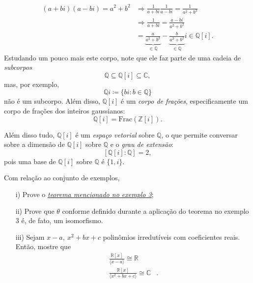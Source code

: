 \documentclass[../algebraIII_notes.tex]{subfiles}
\begin{document}
\begin{example}
\begin{itemize}
		      \begin{align*}
			      (a+bi)(a-bi) = a^{2} + b^{2} & \Rightarrow \frac{1}{a+bi}\frac{1}{a-bi} = \frac{1}{a^{2}+b^{2}}                                                               \\
			                                   & \Rightarrow \frac{1}{a+bi} = \frac{a-bi}{a^{2}+b^{2}}                                                                          \\
			                                   & = \underbrace{\frac{a}{a^{2}+b^{2}}}_{\in \mathbb{Q}} - \underbrace{\frac{b}{a^{2}+b^{2}}}_{\in \mathbb{Q}}i\in \mathbb{Q}[i].
		      \end{align*}
		      Estudando um pouco mais este corpo, note que ele faz parte de uma cadeia de \textit{subcorpos}
		      \[
			      \mathbb{Q}\subseteq \mathbb{Q}[i]\subseteq \mathbb{C},
		      \]
		      mas, por exemplo,
		      \[
			      \mathbb{Q}i\coloneqq \{bi: b \in \mathbb{Q}\}
		      \]
		      não é um subcorpo. Além disso, \(\mathbb{Q}[i]\) é um \textit{corpo de frações}, especificamente um corpo de frações dos inteiros gaussianos:
		      \[
			      \mathbb{Q}[i] = \mathrm{Frac}(\mathbb{Z}[i]).
		      \]

		      Além disso tudo, \(\mathbb{Q}[i]\) é um \textit{espaço vetorial} sobre \(\mathbb{Q}\), o que permite conversar sobre a dimensão de \(\mathbb{Q}[i]\) sobre \(\mathbb{Q}\) e o \textit{grau de extensão}:
		      \[
			      [\mathbb{Q}[i]:\mathbb{Q}] = 2,
		      \]
		      pois uma base de \(\mathbb{Q}[i]\) sobre \(\mathbb{Q}\) é \(\{1, i\}\).
	\end{itemize}
\end{example}

\begin{exr}
	Com relação ao conjunto de exemplos,
	\begin{itemize}
		\item[i)] Prove o \hyperlink{field_generator}{\textit{teorema mencionado no exemplo 3}};
		\item[ii)] Prove que \(\theta \) conforme definido durante a aplicação do teorema no exemplo 3 é, de fato, um isomorfismo.
		\item[iii)] Sejam \(x-a,\: x^{2}+bx+c\) polinômios irredutíveis com coeficientes reais. Então, mostre que
		      \begin{align*}
			      \frac{\mathbb{R}[x]}{\langle x-a \rangle}\cong \mathbb{R}        &   \\
			      \frac{\mathbb{R}[x]}{\langle x^{2}+bx+c \rangle}\cong \mathbb{C} & .
		      \end{align*}
	\end{itemize}
\end{exr}
\end{document}
